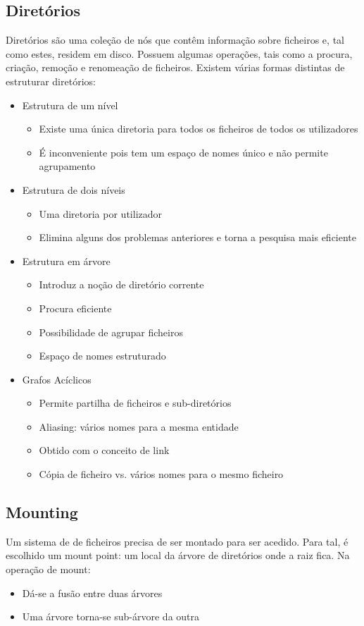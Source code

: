 \documentclass[10pt,a4paper]{report}
\begin{document}
\subsection{Diretórios}
Diretórios são uma coleção de nós que contêm informação sobre ficheiros e, tal como estes, residem em disco. Possuem algumas operações, tais como a procura, criação, remoção e renomeação de ficheiros. Existem várias formas distintas de estruturar diretórios:
\begin{itemize}
\item Estrutura de um nível
\begin{itemize}
\item Existe uma única diretoria para todos os ficheiros de todos os utilizadores
\item É inconveniente pois tem um espaço de nomes único e não permite agrupamento
\end{itemize}
\item Estrutura de dois níveis
\begin{itemize}
\item Uma diretoria por utilizador
\item Elimina alguns dos problemas anteriores e torna a pesquisa mais eficiente
\end{itemize}
\item Estrutura em árvore
\begin{itemize}
\item Introduz a noção de diretório corrente
\item Procura eficiente
\item Possibilidade de agrupar ficheiros
\item Espaço de nomes estruturado
\end{itemize}
\item Grafos Acíclicos
\begin{itemize}
\item Permite partilha de ficheiros e sub-diretórios
\item Aliasing: vários nomes para a mesma entidade
\item Obtido com o conceito de link
\item Cópia de ficheiro vs. vários nomes para o mesmo ficheiro
\end{itemize}
\end{itemize}
\subsection{Mounting}
Um sistema de de ficheiros precisa de ser montado para ser acedido. Para tal, é escolhido um mount point: um local da árvore de diretórios onde a raiz fica. Na operação de mount:
\begin{itemize}
\item Dá-se a fusão entre duas árvores
\item Uma árvore torna-se sub-árvore da outra
\end{itemize}
\end{document}
